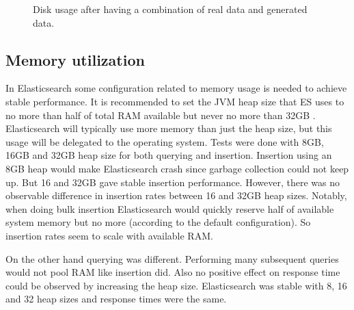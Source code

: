 \begin{figure}[h!]
\centering
{}
\caption{Disk usage after having a combination of real data and generated data.}
\label{fig:discbig}
\end{figure}

\subsection{Memory utilization}

In Elasticsearch some configuration related to memory usage is needed to achieve stable performance. It is recommended to set the JVM heap size that ES uses to no more than half of total RAM available but never no more than 32GB \cite{ESmemory}. Elasticsearch will typically use more memory than just the heap size, but this usage will be delegated to the operating system. Tests were done with 8GB, 16GB and 32GB heap size for both querying and insertion. Insertion using an 8GB heap would make Elasticsearch crash since garbage collection could not keep up. But 16 and 32GB gave stable insertion performance. However, there was no observable difference in insertion rates between 16 and 32GB heap sizes. Notably, when doing bulk insertion Elasticsearch would quickly reserve half of available system memory but no more (according to the default configuration). So insertion rates seem to scale with available RAM.

On the other hand querying was different. Performing many subsequent queries would not pool RAM like insertion did. Also no positive effect on response time could be observed by increasing the heap size. Elasticsearch was stable with 8, 16 and 32 heap sizes and response times were the same. 

